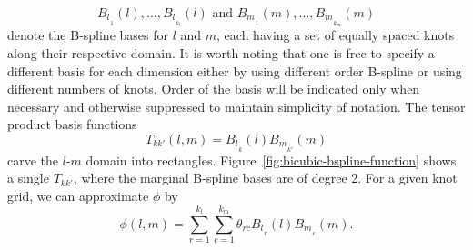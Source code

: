 \[
{B_l}_{_1}\left(l\right),\dots, {B_l}_{_{k_l}}\left(l\right)  \mbox{ and } {B_m}_{_1}\left(m\right),\dots, {B_m}_{_{k_m}}\left(m\right)
\]
\noindent
denote the B-spline bases for $l$ and $m$, each having a set of equally spaced knots along their respective domain. It is worth noting that one is free to specify a different basis for each dimension either by using different order B-spline or using different numbers of knots. Order of the basis will be indicated only when necessary and otherwise suppressed to maintain simplicity of notation. The tensor product basis functions
\begin{equation*}
T_{kk'}\left(l,m\right) = {B_l}_{_k}\left(l\right){B_m}_{_{k'}}\left(m\right)
\end{equation*}
\noindent
carve the $l$-$m$ domain into rectangles. Figure~\ref{fig:bicubic-bspline-function} shows a single $T_{kk'}$, where the marginal B-spline bases are of degree 2. For a given knot grid, we can approximate $\phi$ by
\begin{equation} \label{eq:tensor-product-bspline-expansion-phi}
\phi\left(l,m\right) = \sum_{r=1}^{k_l} \sum_{c=1}^{k_m} \theta_{rc} {B_l}_{_r}\left(l\right) {B_m}_{_c}\left(m\right). 
\end{equation}
\noindent
%
%
